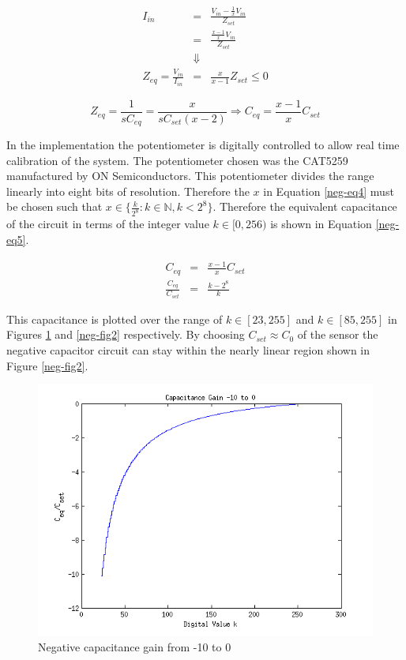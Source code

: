 \begin{eqnarray}
	I_{in}&=&\frac{V_{in}-\frac{1}{x}V_{in}}{Z_{set}}\\
	&=&\frac{\frac{x-1}{x}V_{in}}{Z_{set}}\\
	&\Downarrow&\nonumber\\
	Z_{eq}=\frac{V_{in}}{I_{in}}&=&\frac{x}{x-1}Z_{set}\leq0\label{neg-eq3}
\end{eqnarray}

\begin{equation}
	Z_{eq}=\frac{1}{sC_{eq}}=\frac{x}{sC_{set}(x-2)}\Rightarrow C_{eq}=\frac{x-1}{x}C_{set}\label{neg-eq4}
\end{equation}

In the implementation the potentiometer is digitally controlled to allow real time calibration of the system.  The potentiometer chosen was the CAT5259 manufactured by ON Semiconductors.  This potentiometer divides the range linearly into eight bits of resolution.  Therefore the $x$ in Equation \ref{neg-eq4} must be chosen such that $x\in\{\frac{k}{2^8}: k\in\mathbb{N}, k<2^8\}$.  Therefore the equivalent capacitance of the circuit in terms of the integer value $k\in[0,256)$ is shown in Equation \ref{neg-eq5}.

\begin{eqnarray}
	C_{eq}&=&\frac{x-1}{x}C_{set}\label{neg-eq6}\\
	\frac{C_{eq}}{C_{set}}&=&\frac{k-2^8}{k}\label{neg-eq5}
\end{eqnarray}

This capacitance is plotted over the range of $k\in[23,255]$ and $k\in[85,255]$ in Figures \ref{neg-fig1} and \ref{neg-fig2} respectively.  By choosing $C_{set}\approx C_0$ of the sensor the negative capacitor circuit can stay within the nearly linear region shown in Figure \ref{neg-fig2}.

\begin{figure}
	\begin{center}
		\includegraphics[width=.6\textwidth]{Images/neg-cap-gain-1.png}
		\caption{Negative capacitance gain from -10 to 0\label{neg-fig1}}
	\end{center}
\end{figure}

